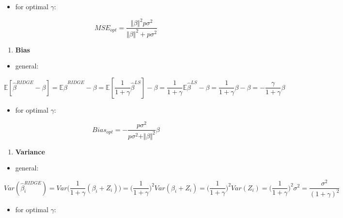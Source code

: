 \documentclass[
]{article}
\providecommand{\tightlist}{%
  \setlength{\itemsep}{0pt}\setlength{\parskip}{0pt}}
\begin{document}
\begin{itemize}
\tightlist
\item
  for optimal \(\gamma\):
\end{itemize}

\[MSE_{opt} = \frac {\Vert\beta\Vert^2 p\sigma^2} {\Vert\beta\Vert^2 + p\sigma^2} \]

\begin{enumerate}
\def\labelenumi{\arabic{enumi}.}
\setcounter{enumi}{3}
\tightlist
\item
  \textbf{Bias}
\end{enumerate}

\begin{itemize}
\tightlist
\item
  general:
\end{itemize}

\[\mathbb E [\hat \beta ^{RIDGE} - \beta] = \mathbb E \hat \beta ^{RIDGE} - \beta = \mathbb E [\frac {1}{1 + \gamma} \hat \beta ^{LS}] - \beta = \frac {1}{1 + \gamma} \mathbb E\hat \beta ^{LS} - \beta = \frac {1}{1 + \gamma}  \beta  - \beta = -\frac {\gamma}{1 + \gamma}  \beta \]

\begin{itemize}
\tightlist
\item
  for optimal \(\gamma\):
\end{itemize}

\[Bias_{opt} = -\frac {p\sigma^2}{p\sigma^2 + \Vert \beta \Vert^2} \beta \]

\begin{enumerate}
\def\labelenumi{\arabic{enumi}.}
\setcounter{enumi}{4}
\tightlist
\item
  \textbf{Variance}
\end{enumerate}

\begin{itemize}
\tightlist
\item
  general:
\end{itemize}

\[Var(\hat \beta_i^{RIDGE}) = 
  Var\Big(\frac {1}{1 +  \gamma} (\beta_i + Z_i)  \Big) = 
  \Big( \frac {1}{1 +  \gamma} \Big)^2 Var(\beta_i +  Z_i) =
  \Big( \frac {1}{1 +  \gamma} \Big)^2 Var(Z_i) = 
  \Big( \frac {1}{1 +  \gamma} \Big)^2 \sigma^2 = 
  \frac {\sigma ^2} {( 1 + \gamma) ^2}\]

\begin{itemize}
\tightlist
\item
  for optimal \(\gamma\):
\end{itemize}
\end{document}
